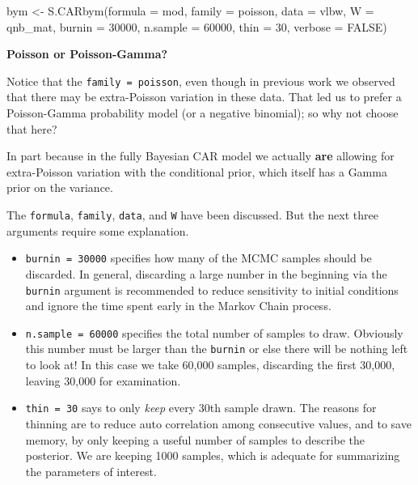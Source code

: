 \documentclass[
]{book}
\newenvironment{Shaded}{\begin{snugshade}}{\end{snugshade}}
\newcommand{\AttributeTok}[1]{\textcolor[rgb]{0.77,0.63,0.00}{#1}}
\newcommand{\ConstantTok}[1]{\textcolor[rgb]{0.00,0.00,0.00}{#1}}
\newcommand{\DecValTok}[1]{\textcolor[rgb]{0.00,0.00,0.81}{#1}}
\newcommand{\FunctionTok}[1]{\textcolor[rgb]{0.00,0.00,0.00}{#1}}
\newcommand{\NormalTok}[1]{#1}
\newcommand{\OtherTok}[1]{\textcolor[rgb]{0.56,0.35,0.01}{#1}}
\newcommand{\StringTok}[1]{\textcolor[rgb]{0.31,0.60,0.02}{#1}}
\providecommand{\tightlist}{%
  \setlength{\itemsep}{0pt}\setlength{\parskip}{0pt}}
\newenvironment{rmdnote}[1]
  {
  \begin{itemize}
  \renewcommand{\labelitemi}{
    \raisebox{-.7\height}[0pt][0pt]{
      {\setkeys{Gin}{width=3em,keepaspectratio}\texttt{[image: images/\#1]}}
    }
  }
  \setlength{\fboxsep}{1em}
  \begin{note}
  \item
  }
  {
  \end{note}
  \end{itemize}
  }
\begin{document}
\begin{Shaded}
\begin{Highlighting}[]
\NormalTok{bym }\OtherTok{\textless{}{-}} \FunctionTok{S.CARbym}\NormalTok{(}\AttributeTok{formula =}\NormalTok{ mod, }
                        \AttributeTok{family =} \StringTok{\textquotesingle{}poisson\textquotesingle{}}\NormalTok{, }
                        \AttributeTok{data =}\NormalTok{ vlbw, }
                        \AttributeTok{W =}\NormalTok{ qnb\_mat,}
                        \AttributeTok{burnin =} \DecValTok{30000}\NormalTok{, }
                        \AttributeTok{n.sample =} \DecValTok{60000}\NormalTok{, }
                        \AttributeTok{thin =} \DecValTok{30}\NormalTok{,}
                        \AttributeTok{verbose =} \ConstantTok{FALSE}\NormalTok{)}
\end{Highlighting}
\end{Shaded}

\begin{rmdnote}{note}
\textbf{Poisson or Poisson-Gamma?}

Notice that the \texttt{family\ =\ \textquotesingle{}poisson\textquotesingle{}}, even though in previous work we observed that there may be extra-Poisson variation in these data. That led us to prefer a Poisson-Gamma probability model (or a negative binomial); so why not choose that here?

In part because in the fully Bayesian CAR model we actually \textbf{are} allowing for extra-Poisson variation with the conditional prior, which itself has a Gamma prior on the variance.

\end{rmdnote}

The \texttt{formula}, \texttt{family}, \texttt{data}, and \texttt{W} have been discussed. But the next three arguments require some explanation.

\begin{itemize}
\tightlist
\item
  \texttt{burnin\ =\ 30000} specifies how many of the MCMC samples should be discarded. In general, discarding a large number in the beginning via the \texttt{burnin} argument is recommended to reduce sensitivity to initial conditions and ignore the time spent early in the Markov Chain process.
\item
  \texttt{n.sample\ =\ 60000} specifies the total number of samples to draw. Obviously this number must be larger than the \texttt{burnin} or else there will be nothing left to look at! In this case we take 60,000 samples, discarding the first 30,000, leaving 30,000 for examination.
\item
  \texttt{thin\ =\ 30} says to only \emph{keep} every 30th sample drawn. The reasons for thinning are to reduce auto correlation among consecutive values, and to save memory, by only keeping a useful number of samples to describe the posterior. We are keeping 1000 samples, which is adequate for summarizing the parameters of interest.
\end{itemize}
\end{document}
